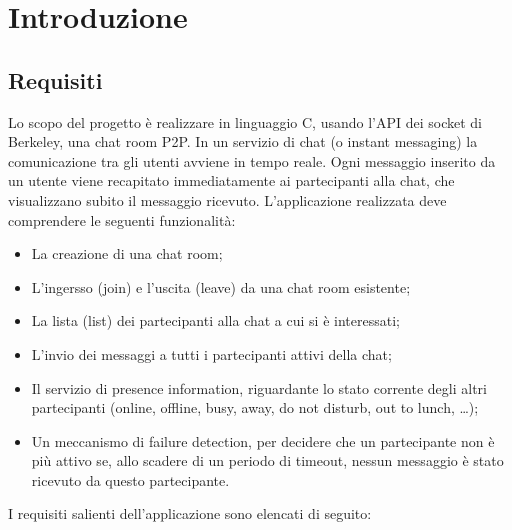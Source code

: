 \chapter{Introduzione}
\section{Requisiti}
Lo scopo del progetto è realizzare in linguaggio C, usando l’API dei socket di Berkeley, una chat room P2P. In un servizio di chat (o instant messaging) la comunicazione tra gli utenti avviene in tempo reale. Ogni messaggio inserito da un utente viene recapitato immediatamente ai partecipanti alla chat, che visualizzano subito il messaggio ricevuto.
L’applicazione realizzata deve comprendere le seguenti funzionalità:
\begin{itemize}
\item La creazione di una chat room;
\item L’ingersso (join) e l’uscita (leave) da una chat room esistente;
\item La lista (list) dei partecipanti alla chat a cui si è interessati;
\item L’invio dei messaggi a tutti i partecipanti attivi della chat;
\item Il servizio di presence information, riguardante lo stato corrente degli altri partecipanti (online, offline, busy, away, do not disturb, out to lunch, …);
\item Un meccanismo di failure detection, per decidere che un partecipante non è più attivo se, allo scadere di un periodo di timeout, nessun messaggio è stato ricevuto da questo partecipante.
\end{itemize}
I requisiti salienti dell’applicazione sono elencati di seguito:
